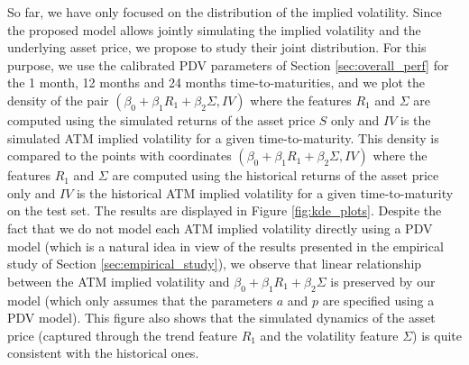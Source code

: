 So far, we have only focused on the distribution of the implied volatility. Since the proposed model allows jointly simulating the implied volatility and the underlying asset price, we propose to study their joint distribution. For this purpose, we use the calibrated PDV parameters of Section \ref{sec:overall_perf} for the 1 month, 12 months and 24 months time-to-maturities, and we plot the density of the pair $(\beta_0+\beta_1R_{1}+\beta_2\Sigma,IV)$ where the features $R_1$ and $\Sigma$ are computed using the simulated returns of the asset price $S$ only and $IV$ is the simulated ATM implied volatility for a given time-to-maturity. This density is compared to the points with coordinates $(\beta_0+\beta_1R_{1}+\beta_2\Sigma,IV)$ where the features $R_1$ and $\Sigma$ are computed using the historical returns of the asset price only and $IV$ is the historical ATM implied volatility for a given time-to-maturity on the test set. The results are displayed in Figure \ref{fig:kde_plots}. Despite the fact that we do not model each ATM implied volatility directly using a PDV model (which is a natural idea in view of the results presented in the empirical study of Section \ref{sec:empirical_study}), we observe that linear relationship between the ATM implied volatility and $\beta_0+\beta_1R_1+\beta_2\Sigma$ is preserved by our model (which only assumes that the parameters $a$ and $p$ are specified using a PDV model). This figure also shows that the simulated dynamics of the asset price (captured through the trend feature $R_1$ and the volatility feature $\Sigma$) is quite consistent with the historical ones. \\


